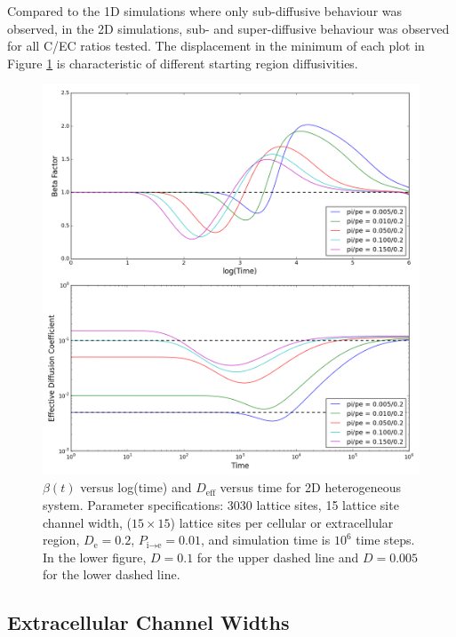 	\newpage
	Compared to the 1D simulations where only sub-diffusive behaviour was observed, in the 2D simulations, sub- and super-diffusive behaviour was observed for all C/EC ratios tested. The displacement in the minimum of each plot in Figure \ref{fig:pipe_beta_deff_2D} is characteristic of different starting region diffusivities.

	\begin{figure}[h!]
		\centering
		\includegraphics[width=1.0\linewidth]{../images/2D/pipe_beta_deff_2D}
		\caption[2D: $ \beta (t) $ and $ D_\textrm{eff} $ for varying diffusivities]{$ \beta (t) $ versus log(time) and $ D_\textrm{eff} $ versus time for 2D heterogeneous system. Parameter specifications: 3030 lattice sites, 15 lattice site channel width, ($ 15 \times 15 $) lattice sites per cellular or extracellular region, $ D_\textrm{e} = 0.2 $, $ P_{\textrm{i} \rightarrow \textrm{e}} = 0.01 $, and simulation time is $ 10^6 $ time steps. In the lower figure, $ D = 0.1 $ for the upper dashed line and $ D = 0.005 $ for the lower dashed line.}
		\label{fig:pipe_beta_deff_2D}
	\end{figure}
	
\clearpage
\subsection{Extracellular Channel Widths}
\label{sec:2D-channel-width}
	
